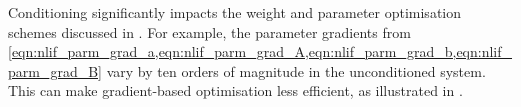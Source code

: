 Conditioning significantly impacts the weight and parameter optimisation schemes discussed in .
For example, the parameter gradients from \cref{eqn:nlif_parm_grad_a,eqn:nlif_parm_grad_A,eqn:nlif_parm_grad_b,eqn:nlif_parm_grad_B} vary by ten orders of magnitude in the unconditioned system.
This can make gradient-based optimisation less efficient, as illustrated in .

